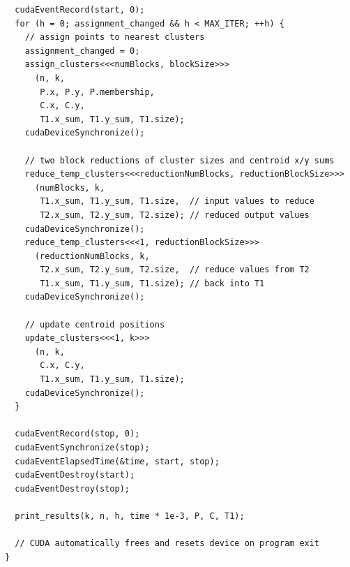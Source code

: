 \documentclass{article}
\begin{document}
\begin{lstlisting}
  cudaEventRecord(start, 0);
  for (h = 0; assignment_changed && h < MAX_ITER; ++h) {
    // assign points to nearest clusters
    assignment_changed = 0;
    assign_clusters<<<numBlocks, blockSize>>>
      (n, k,
       P.x, P.y, P.membership,
       C.x, C.y,
       T1.x_sum, T1.y_sum, T1.size);
    cudaDeviceSynchronize();

    // two block reductions of cluster sizes and centroid x/y sums
    reduce_temp_clusters<<<reductionNumBlocks, reductionBlockSize>>>
      (numBlocks, k,
       T1.x_sum, T1.y_sum, T1.size,  // input values to reduce
       T2.x_sum, T2.y_sum, T2.size); // reduced output values
    cudaDeviceSynchronize();
    reduce_temp_clusters<<<1, reductionBlockSize>>>
      (reductionNumBlocks, k,
       T2.x_sum, T2.y_sum, T2.size,  // reduce values from T2
       T1.x_sum, T1.y_sum, T1.size); // back into T1
    cudaDeviceSynchronize();

    // update centroid positions
    update_clusters<<<1, k>>>
      (n, k,
       C.x, C.y,
       T1.x_sum, T1.y_sum, T1.size);
    cudaDeviceSynchronize();
  }

  cudaEventRecord(stop, 0);
  cudaEventSynchronize(stop);
  cudaEventElapsedTime(&time, start, stop);
  cudaEventDestroy(start);
  cudaEventDestroy(stop);

  print_results(k, n, h, time * 1e-3, P, C, T1);

  // CUDA automatically frees and resets device on program exit
}
	\end{lstlisting}
\end{document}
